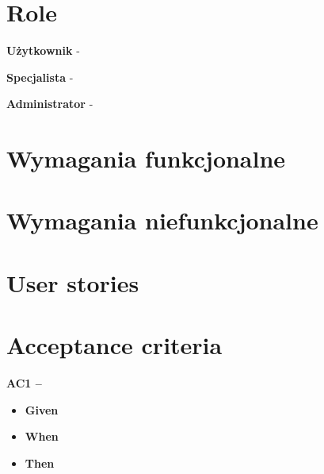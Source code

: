 \documentclass[12pt,a4paper]{article}
\begin{document}
\section{Role}
\begin{imtemize}
    \item \textbf{Użytkownik} - 
    \item \textbf{Specjalista} - 
    \item \textbf{Administrator} - 
\end{imtemize}


\section{Wymagania funkcjonalne}
\begin{description}[leftmargin=1.8cm, labelwidth=1.3cm, labelsep=0.5cm]
    \item[FR1]
\end{description}

\section{Wymagania niefunkcjonalne}
\begin{description}[leftmargin=1.8cm, labelwidth=1.3cm, labelsep=0.5cm]
    \item[NFR1]
\end{description}

\section{User stories}
\begin{description}[leftmargin=1.8cm, labelwidth=1.3cm, labelsep=0.5cm]
    \item[US1] 
\end{description}

\section{Acceptance criteria}

\begin{description}[leftmargin=1.5cm, labelwidth=1cm, labelsep=0.5cm]
\textbf{AC1 -- }
\begin{itemize}[itemsep=2pt]
    \item \textbf{Given}
    \item \textbf{When}
    \item \textbf{Then}
\end{itemize}

\vspace{0.5cm}

\end{description}
\end{document}
